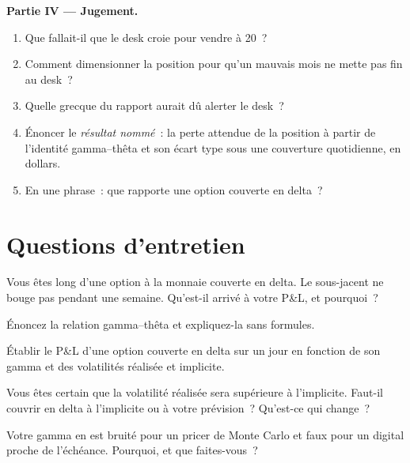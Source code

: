 \begin{problem}
\medskip\noindent\textbf{Partie IV --- Jugement.}
\begin{enumerate}[resume]
\item Que fallait-il que le desk croie pour vendre à 20~?
\item Comment dimensionner la position pour qu'un mauvais mois ne mette pas fin au desk~?
\item Quelle grecque du rapport aurait dû alerter le desk~?
\item Énoncer le \emph{résultat nommé}~: la perte attendue de la position à partir de l'identité
gamma--thêta et son écart type sous une couverture quotidienne, en dollars.
\item En une phrase~: que rapporte une option couverte en delta~?
\end{enumerate}
\end{problem}

\section{Questions d'entretien}

\begin{interviewq}\label{iq:dv:greeks-and-the-hedging-pnl:1}
Vous êtes long d'une option à la monnaie couverte en delta. Le sous-jacent ne bouge pas pendant
une semaine. Qu'est-il arrivé à votre P\&L, et pourquoi~?
\end{interviewq}

\begin{interviewq}\label{iq:dv:greeks-and-the-hedging-pnl:2}
Énoncez la relation gamma--thêta et expliquez-la sans formules.
\end{interviewq}

\begin{interviewq}\label{iq:dv:greeks-and-the-hedging-pnl:3}
Établir le P\&L d'une option couverte en delta sur un jour en fonction de son gamma et des
volatilités réalisée et implicite.
\end{interviewq}

\begin{interviewq}\label{iq:dv:greeks-and-the-hedging-pnl:4}
Vous êtes certain que la volatilité réalisée sera supérieure à l'implicite. Faut-il couvrir en delta à l'implicite
ou à votre prévision~? Qu'est-ce qui change~?
\end{interviewq}

\begin{interviewq}\label{iq:dv:greeks-and-the-hedging-pnl:5}
Votre gamma en  est bruité pour un pricer de Monte Carlo et faux pour un digital
proche de l'échéance. Pourquoi, et que faites-vous~?
\end{interviewq}

